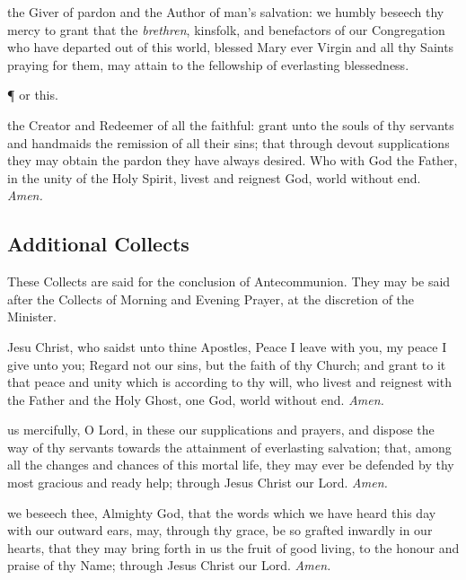 \vspace{0.25\baselineskip}

 the Giver of pardon and the Author of man's salvation: we humbly beseech thy mercy to grant that the \textit{brethren}, kinsfolk, and benefactors of our Congregation who have departed out of this world, blessed Mary ever Virgin and all thy Saints praying for them, may attain to the fellowship of everlasting blessedness.

\vspace{0.25\baselineskip}

\begin{inhead}
	\P{ }or this.
\end{inhead}

\vspace{0.25\baselineskip}

 the Creator and Redeemer of all the faithful: grant unto the souls of thy servants and handmaids the remission of all their sins; that through devout supplications they may obtain the pardon they have always desired. Who with God the Father, in the unity of the Holy Spirit, livest and reignest God, world without end. \textit{Amen.}

\clearpage
\subsection{Additional Collects}\label{AdditionalCollects}
\begin{rubric}
    These Collects are said for the conclusion of Antecommunion. They may be said after the Collects of Morning and Evening Prayer, at the discretion of the Minister.
\end{rubric}
 Jesu Christ, who saidst unto thine Apostles, Peace I leave with you, my peace I give unto you; Regard not our sins, but the faith of thy Church; and grant to it that peace and unity which is according to thy will, who livest and reignest with the Father and the Holy Ghost, one God, world without end. \textit{Amen.}

 us mercifully, O Lord, in these our supplications and prayers, and dispose the way of thy servants towards the attainment of everlasting salvation; that, among all the changes and chances of this mortal life, they may ever be defended by thy most gracious and ready help; through Jesus Christ our Lord. \textit{Amen.}

 we beseech thee, Almighty God, that the words which we have heard this day with our outward ears, may, through thy grace, be so grafted inwardly in our hearts, that they may bring forth in us the fruit of good living, to the honour and praise of thy Name; through Jesus Christ our Lord. \textit{Amen.}

